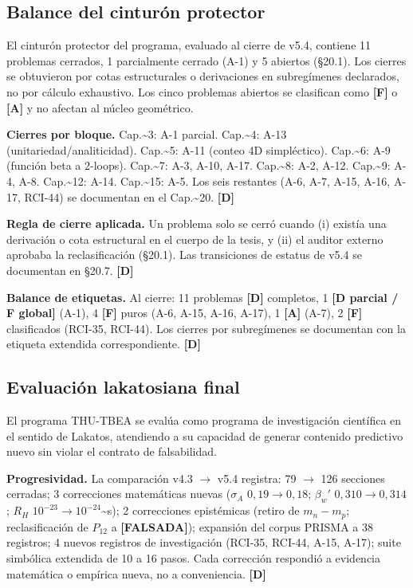 ﻿\documentclass[11pt,letterpaper]{article}
\begin{document}
\subsection{Balance del cinturón protector}
El cinturón protector del programa, evaluado al cierre de v5.4, contiene 11 problemas cerrados, 1 parcialmente cerrado (A-1) y 5 abiertos (§20.1). Los cierres se obtuvieron por cotas estructurales o derivaciones en subregímenes declarados, no por cálculo exhaustivo. Los cinco problemas abiertos se clasifican como \textbf{[F]} o \textbf{[A]} y no afectan al núcleo geométrico.

\textbf{Cierres por bloque.} Cap.\textasciitilde{}3: A-1 parcial. Cap.\textasciitilde{}4: A-13 (unitariedad/analiticidad). Cap.\textasciitilde{}5: A-11 (conteo 4D simpléctico). Cap.\textasciitilde{}6: A-9 (función beta a 2-loops). Cap.\textasciitilde{}7: A-3, A-10, A-17. Cap.\textasciitilde{}8: A-2, A-12. Cap.\textasciitilde{}9: A-4, A-8. Cap.\textasciitilde{}12: A-14. Cap.\textasciitilde{}15: A-5. Los seis restantes (A-6, A-7, A-15, A-16, A-17, RCI-44) se documentan en el Cap.\textasciitilde{}20. \textbf{[D]}

\textbf{Regla de cierre aplicada.} Un problema solo se cerró cuando (i) existía una derivación o cota estructural en el cuerpo de la tesis, y (ii) el auditor externo aprobaba la reclasificación (§20.1). Las transiciones de estatus de v5.4 se documentan en §20.7. \textbf{[D]}

\textbf{Balance de etiquetas.} Al cierre: 11 problemas \textbf{[D]} completos, 1 \textbf{[D parcial / F global]} (A-1), 4 \textbf{[F]} puros (A-6, A-15, A-16, A-17), 1 \textbf{[A]} (A-7), 2 \textbf{[F]} clasificados (RCI-35, RCI-44). Los cierres por subregímenes se documentan con la etiqueta extendida correspondiente. \textbf{[D]}
\subsection{Evaluación lakatosiana final}
El programa THU-TBEA se evalúa como programa de investigación científica en el sentido de Lakatos, atendiendo a su capacidad de generar contenido predictivo nuevo sin violar el contrato de falsabilidad.

\textbf{Progresividad.} La comparación v4.3 $\to$ v5.4 registra: 79 $\to$ 126 secciones cerradas; 3 correcciones matemáticas nuevas ($\sigma_A$ $0{,}19 \to 0{,}18$; $\beta_w'$ $0{,}310 \to 0{,}314$; $R_H$ $10^{-23} \to 10^{-24}$\textasciitilde{}s); 2 correcciones epistémicas (retiro de $m_n - m_p$; reclasificación de $P_{12}$ a \textbf{[FALSADA]}); expansión del corpus PRISMA a 38 registros; 4 nuevos registros de investigación (RCI-35, RCI-44, A-15, A-17); suite simbólica extendida de 10 a 16 pasos. Cada corrección respondió a evidencia matemática o empírica nueva, no a conveniencia. \textbf{[D]}
\end{document}
